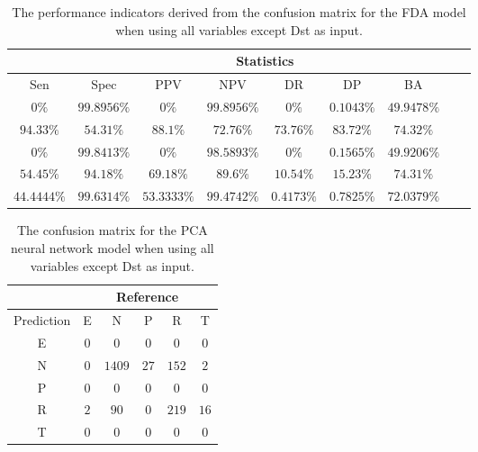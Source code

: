 \begin{table}[!ht]
	\centering
	\begin{tabular}{|c|c|c|c|c|c|c|c|c|}
		\hline
		 & \multicolumn{7}{c|}{Statistics} \\ \hline
		Sen & Spec & PPV & NPV & DR & DP & BA \\ \hline
		$0\%$ & $99.8956\%$ & $0\%$ & $99.8956\%$ & $0\%$ & $0.1043\%$ & $49.9478\%$ \\ \hline
		$94.33\%$ & $54.31\%$ & $88.1\%$ & $72.76\%$ & $73.76\%$ & $83.72\%$ & $74.32\%$ \\ \hline
		$0\%$ & $99.8413\%$ & $0\%$ & $98.5893\%$ & $0\%$ & $0.1565\%$ & $49.9206\%$ \\ \hline
		$54.45\%$ & $94.18\%$ & $69.18\%$ & $89.6\%$ & $10.54\%$ & $15.23\%$ & $74.31\%$ \\ \hline
		$44.4444\%$ & $99.6314\%$ & $53.3333\%$ & $99.4742\%$ & $0.4173\%$ & $0.7825\%$ & $72.0379\%$ \\ \hline
	\end{tabular}
	\caption{The performance indicators derived from the confusion matrix for the FDA model when using all variables except Dst as input.}
	\label{tab:cs:noDst:fda}
\end{table}

\begin{table}[!ht]
	\centering
	\begin{tabular}{|c|c|c|c|c|c|}
		\hline
		 & \multicolumn{5}{|c|}{Reference} \\ \hline
		 Prediction & E & N & P & R & T \\ \hline
		 E & $0$ & $0$ & $0$ & $0$ & $0$ \\ \hline
		 N & $0$ & $1409$ & $27$ & $152$ & $2$ \\ \hline
		 P & $0$ & $0$ & $0$ & $0$ & $0$ \\ \hline
		 R & $2$ & $90$ & $0$ & $219$ & $16$ \\ \hline
		 T & $0$ & $0$ & $0$ & $0$ & $0$ \\ \hline
	\end{tabular}
	\caption{The confusion matrix for the PCA neural network model when using all variables except Dst as input.}
	\label{tab:cm:noDst:pcaNNet}
\end{table}

